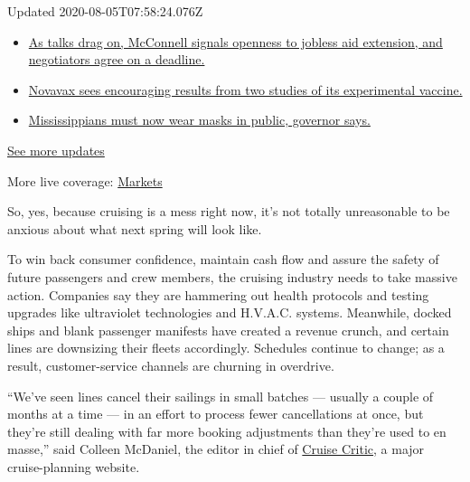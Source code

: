 Updated 2020-08-05T07:58:24.076Z

\begin{itemize}
\tightlist
\item
  \href{https://www.nytimes3xbfgragh.onion/2020/08/04/world/coronavirus-cases.html?action=click\&pgtype=Article\&state=default\&region=MAIN_CONTENT_1\&context=storylines_live_updates\#link-762df92}{As
  talks drag on, McConnell signals openness to jobless aid extension,
  and negotiators agree on a deadline.}
\item
  \href{https://www.nytimes3xbfgragh.onion/2020/08/04/world/coronavirus-cases.html?action=click\&pgtype=Article\&state=default\&region=MAIN_CONTENT_1\&context=storylines_live_updates\#link-1228a480}{Novavax
  sees encouraging results from two studies of its experimental
  vaccine.}
\item
  \href{https://www.nytimes3xbfgragh.onion/2020/08/04/world/coronavirus-cases.html?action=click\&pgtype=Article\&state=default\&region=MAIN_CONTENT_1\&context=storylines_live_updates\#link-794484ed}{Mississippians
  must now wear masks in public, governor says.}
\end{itemize}

\href{https://www.nytimes3xbfgragh.onion/2020/08/04/world/coronavirus-cases.html?action=click\&pgtype=Article\&state=default\&region=MAIN_CONTENT_1\&context=storylines_live_updates}{See
more updates}

More live coverage:
\href{https://www.nytimes3xbfgragh.onion/live/2020/08/04/business/stock-market-today-coronavirus?action=click\&pgtype=Article\&state=default\&region=MAIN_CONTENT_1\&context=storylines_live_updates}{Markets}

So, yes, because cruising is a mess right now, it's not totally
unreasonable to be anxious about what next spring will look like.

To win back consumer confidence, maintain cash flow and assure the
safety of future passengers and crew members, the cruising industry
needs to take massive action. Companies say they are hammering out
health protocols and testing upgrades like ultraviolet technologies and
H.V.A.C. systems. Meanwhile, docked ships and blank passenger manifests
have created a revenue crunch, and certain lines are downsizing their
fleets accordingly. Schedules continue to change; as a result,
customer-service channels are churning in overdrive.

``We've seen lines cancel their sailings in small batches --- usually a
couple of months at a time --- in an effort to process fewer
cancellations at once, but they're still dealing with far more booking
adjustments than they're used to en masse,'' said Colleen McDaniel, the
editor in chief of \href{https://www.cruisecritic.com/}{Cruise Critic},
a major cruise-planning website.

